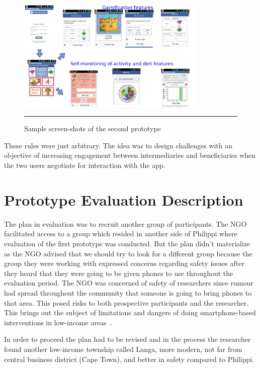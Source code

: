 \begin{figure}[htbp]
  \centering
    \includegraphics[width=0.8\textwidth]{Figures/Version2/Prototype2Screenshots.png}
    \rule{35em}{0.5pt}
  \caption{Sample screen-shots of the second prototype}
  \label{figure:prototype_2_screens}
\end{figure}

These rules were just arbitrary. The idea was to design challenges with an objective of increasing engagement between intermediaries and beneficiaries when the two users negotiate for interaction with the app.
\section{Prototype Evaluation Description}
The plan in evaluation was to recruit another group of participants. The NGO facilitated access to a group which resided in another side of Philippi where evaluation of the first prototype was conducted. But the plan didn't materialize as the NGO advised that we should try to look for a different group because the group they were working with expressed concerns regarding safety issues after they heard that they were going to be given phones to use throughout the evaluation period. The NGO was concerned of safety of researchers since rumour had spread throughout the community that someone is going to bring phones to that area. This posed risks to both prospective participants and the researcher. This brings out the subject of limitations and dangers of doing smartphone-based interventions in low-income areas~\citep{Molapo2015}. 

In order to proceed the plan had to be revised and in the process the researcher found another low-income township called Langa, more modern, not far from central business district (Cape Town), and better in safety compared to Philippi. 


